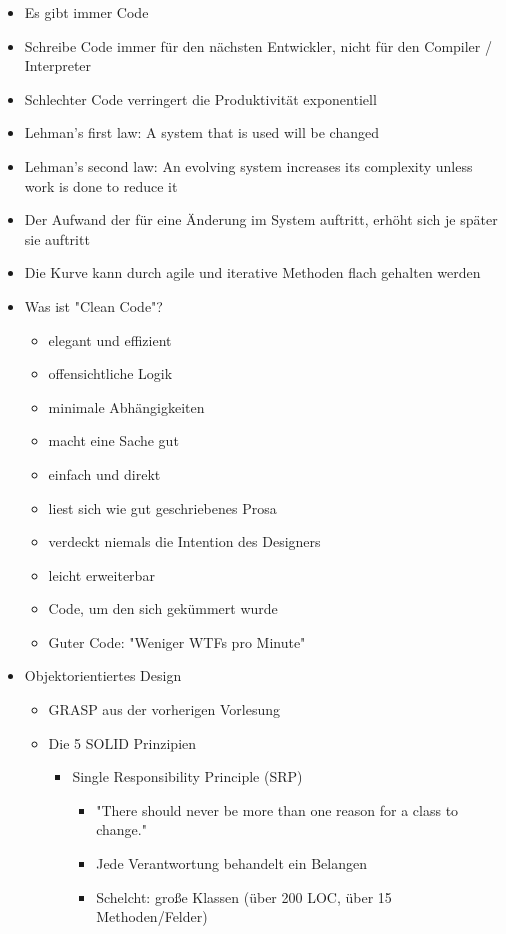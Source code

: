 \documentclass[paper=a4, fontsize=11pt]{scrartcl} %
\numberwithin{equation}{section} %
\numberwithin{figure}{section} %
\numberwithin{table}{section} %
\begin{document}
\begin{itemize}
  \item Es gibt immer Code
  \item Schreibe Code immer für den nächsten Entwickler, nicht für den Compiler / Interpreter
  \item Schlechter Code verringert die Produktivität exponentiell
  \item Lehman's first law: A system that is used will be changed
  \item Lehman's second law: An evolving system increases its complexity unless work is done to reduce it
  \item Der Aufwand der für eine Änderung im System auftritt, erhöht sich je später sie auftritt
  \item Die Kurve kann durch agile und iterative Methoden flach gehalten werden
  \item Was ist "Clean Code"?
  \begin{itemize}
    \item elegant und effizient
    \item offensichtliche Logik
    \item minimale Abhängigkeiten
    \item macht eine Sache gut
    \item einfach und direkt
    \item liest sich wie gut geschriebenes Prosa
    \item verdeckt niemals die Intention des Designers
    \item leicht erweiterbar
    \item Code, um den sich gekümmert wurde
    \item Guter Code: "Weniger WTFs pro Minute"
  \end{itemize}
  \item Objektorientiertes Design
  \begin{itemize}
    \item GRASP aus der vorherigen Vorlesung
    \item Die 5 SOLID Prinzipien
    \begin{itemize}
      \item Single Responsibility Principle (SRP)
      \begin{itemize}
        \item "There should never be more than one reason for a class to change."
        \item Jede Verantwortung behandelt ein Belangen
        \item Schelcht: große Klassen (über 200 LOC, über 15 Methoden/Felder)

\end{itemize}
\end{itemize}
\end{itemize}
\end{itemize}
\end{document}
